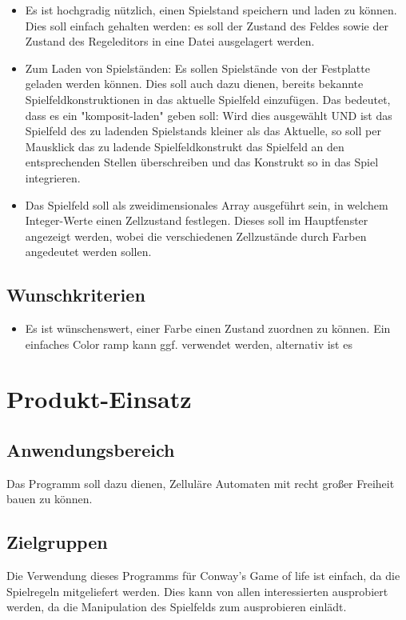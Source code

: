 \documentclass[12pt]{article}
\begin{document}
\begin{itemize}
    \item Es ist hochgradig nützlich, einen Spielstand speichern und laden zu können. Dies soll einfach gehalten werden: es soll der Zustand des Feldes sowie der Zustand des Regeleditors in eine Datei ausgelagert werden.
    \item Zum Laden von Spielständen: Es sollen Spielstände von der Festplatte geladen werden können. Dies soll auch dazu dienen, bereits bekannte Spielfeldkonstruktionen in das aktuelle Spielfeld einzufügen. Das bedeutet, dass es ein "komposit-laden" geben soll: Wird dies ausgewählt UND ist das Spielfeld des zu ladenden Spielstands kleiner als das Aktuelle, so soll per Mausklick das zu ladende Spielfeldkonstrukt das Spielfeld an den entsprechenden Stellen überschreiben und das Konstrukt so in das Spiel integrieren.
    \item Das Spielfeld soll als zweidimensionales Array ausgeführt sein, in welchem Integer-Werte einen Zellzustand festlegen. Dieses soll im Hauptfenster angezeigt werden, wobei die verschiedenen Zellzustände durch Farben angedeutet werden sollen.
    
    
    
    
\end{itemize}
\subsection{Wunschkriterien}
\begin{itemize}
    \item Es ist wünschenswert, einer Farbe einen Zustand zuordnen zu können. Ein einfaches Color ramp kann ggf. verwendet werden, alternativ ist es  
\end{itemize}


\pagebreak
\section{Produkt-Einsatz}
\subsection{Anwendungsbereich}
Das Programm soll dazu dienen, Zelluläre Automaten mit recht großer Freiheit bauen zu können. 
\subsection{Zielgruppen}
Die Verwendung dieses Programms für Conway's Game of life ist einfach, da die Spielregeln mitgeliefert werden. Dies kann von allen interessierten ausprobiert werden, da die Manipulation des Spielfelds zum ausprobieren einlädt.
\end{document}
